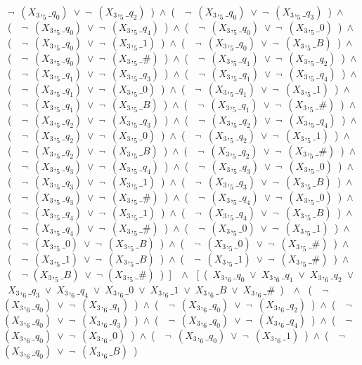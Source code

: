 ﻿\documentclass[a4paper,10pt]{article}
\begin{document}
\ $\neg$\ $(X_3,_5\_q_0)$\ $\vee$\ $\neg$\ $(X_3,_5\_q_2)$\ )\ $\wedge$\ (\ \ $\neg$\ $(X_3,_5\_q_0)$\ $\vee$\ $\neg$\ $(X_3,_5\_q_3)$\ )\ $\wedge$\ (\ \ $\neg$\ $(X_3,_5\_q_0)$\ $\vee$\ $\neg$\ $(X_3,_5\_q_4)$\ )\ $\wedge$\ (\ \ $\neg$\ $(X_3,_5\_q_0)$\ $\vee$\ $\neg$\ $(X_3,_5\_0)$\ )\ $\wedge$\ (\ \ $\neg$\ $(X_3,_5\_q_0)$\ $\vee$\ $\neg$\ $(X_3,_5\_1)$\ )\ $\wedge$\ (\ \ $\neg$\ $(X_3,_5\_q_0)$\ $\vee$\ $\neg$\ $(X_3,_5\_B)$\ )\ $\wedge$\ (\ \ $\neg$\ $(X_3,_5\_q_0)$\ $\vee$\ $\neg$\ $(X_3,_5\_\#)$\ )\ $\wedge$\ (\ \ $\neg$\ $(X_3,_5\_q_1)$\ $\vee$\ $\neg$\ $(X_3,_5\_q_2)$\ )\ $\wedge$\ (\ \ $\neg$\ $(X_3,_5\_q_1)$\ $\vee$\ $\neg$\ $(X_3,_5\_q_3)$\ )\ $\wedge$\ (\ \ $\neg$\ $(X_3,_5\_q_1)$\ $\vee$\ $\neg$\ $(X_3,_5\_q_4)$\ )\ $\wedge$\ (\ \ $\neg$\ $(X_3,_5\_q_1)$\ $\vee$\ $\neg$\ $(X_3,_5\_0)$\ )\ $\wedge$\ (\ \ $\neg$\ $(X_3,_5\_q_1)$\ $\vee$\ $\neg$\ $(X_3,_5\_1)$\ )\ $\wedge$\ (\ \ $\neg$\ $(X_3,_5\_q_1)$\ $\vee$\ $\neg$\ $(X_3,_5\_B)$\ )\ $\wedge$\ (\ \ $\neg$\ $(X_3,_5\_q_1)$\ $\vee$\ $\neg$\ $(X_3,_5\_\#)$\ )\ $\wedge$\ (\ \ $\neg$\ $(X_3,_5\_q_2)$\ $\vee$\ $\neg$\ $(X_3,_5\_q_3)$\ )\ $\wedge$\ (\ \ $\neg$\ $(X_3,_5\_q_2)$\ $\vee$\ $\neg$\ $(X_3,_5\_q_4)$\ )\ $\wedge$\ (\ \ $\neg$\ $(X_3,_5\_q_2)$\ $\vee$\ $\neg$\ $(X_3,_5\_0)$\ )\ $\wedge$\ (\ \ $\neg$\ $(X_3,_5\_q_2)$\ $\vee$\ $\neg$\ $(X_3,_5\_1)$\ )\ $\wedge$\ (\ \ $\neg$\ $(X_3,_5\_q_2)$\ $\vee$\ $\neg$\ $(X_3,_5\_B)$\ )\ $\wedge$\ (\ \ $\neg$\ $(X_3,_5\_q_2)$\ $\vee$\ $\neg$\ $(X_3,_5\_\#)$\ )\ $\wedge$\ (\ \ $\neg$\ $(X_3,_5\_q_3)$\ $\vee$\ $\neg$\ $(X_3,_5\_q_4)$\ )\ $\wedge$\ (\ \ $\neg$\ $(X_3,_5\_q_3)$\ $\vee$\ $\neg$\ $(X_3,_5\_0)$\ )\ $\wedge$\ (\ \ $\neg$\ $(X_3,_5\_q_3)$\ $\vee$\ $\neg$\ $(X_3,_5\_1)$\ )\ $\wedge$\ (\ \ $\neg$\ $(X_3,_5\_q_3)$\ $\vee$\ $\neg$\ $(X_3,_5\_B)$\ )\ $\wedge$\ (\ \ $\neg$\ $(X_3,_5\_q_3)$\ $\vee$\ $\neg$\ $(X_3,_5\_\#)$\ )\ $\wedge$\ (\ \ $\neg$\ $(X_3,_5\_q_4)$\ $\vee$\ $\neg$\ $(X_3,_5\_0)$\ )\ $\wedge$\ (\ \ $\neg$\ $(X_3,_5\_q_4)$\ $\vee$\ $\neg$\ $(X_3,_5\_1)$\ )\ $\wedge$\ (\ \ $\neg$\ $(X_3,_5\_q_4)$\ $\vee$\ $\neg$\ $(X_3,_5\_B)$\ )\ $\wedge$\ (\ \ $\neg$\ $(X_3,_5\_q_4)$\ $\vee$\ $\neg$\ $(X_3,_5\_\#)$\ )\ $\wedge$\ (\ \ $\neg$\ $(X_3,_5\_0)$\ $\vee$\ $\neg$\ $(X_3,_5\_1)$\ )\ $\wedge$\ (\ \ $\neg$\ $(X_3,_5\_0)$\ $\vee$\ $\neg$\ $(X_3,_5\_B)$\ )\ $\wedge$\ (\ \ $\neg$\ $(X_3,_5\_0)$\ $\vee$\ $\neg$\ $(X_3,_5\_\#)$\ )\ $\wedge$\ (\ \ $\neg$\ $(X_3,_5\_1)$\ $\vee$\ $\neg$\ $(X_3,_5\_B)$\ )\ $\wedge$\ (\ \ $\neg$\ $(X_3,_5\_1)$\ $\vee$\ $\neg$\ $(X_3,_5\_\#)$\ )\ $\wedge$\ (\ \ $\neg$ $(X_3,_5\_B)$\ $\vee$\ $\neg$ $(X_3,_5\_\#)$\ )\ ]\ \ $\wedge$ \ [\ (\ $X_3,_6\_q_0$\ $\vee$\ $X_3,_6\_q_1$\ $\vee$\ $X_3,_6\_q_2$\ $\vee$\ $X_3,_6\_q_3$\ $\vee$\ $X_3,_6\_q_4$\ $\vee$\ $X_3,_6\_0$\ $\vee$\ $X_3,_6\_1$\ $\vee$\ $X_3,_6\_B$\ $\vee$\ $X_3,_6\_\#$\ )\ \ $\wedge$ \ (\ \ $\neg$\ $(X_3,_6\_q_0)$\ $\vee$\ $\neg$\ $(X_3,_6\_q_1)$\ )\ $\wedge$\ (\ \ $\neg$\ $(X_3,_6\_q_0)$\ $\vee$\ $\neg$\ $(X_3,_6\_q_2)$\ )\ $\wedge$\ (\ \ $\neg$\ $(X_3,_6\_q_0)$\ $\vee$\ $\neg$\ $(X_3,_6\_q_3)$\ )\ $\wedge$\ (\ \ $\neg$\ $(X_3,_6\_q_0)$\ $\vee$\ $\neg$\ $(X_3,_6\_q_4)$\ )\ $\wedge$\ (\ \ $\neg$\ $(X_3,_6\_q_0)$\ $\vee$\ $\neg$\ $(X_3,_6\_0)$\ )\ $\wedge$\ (\ \ $\neg$\ $(X_3,_6\_q_0)$\ $\vee$\ $\neg$\ $(X_3,_6\_1)$\ )\ $\wedge$\ (\ \ $\neg$\ $(X_3,_6\_q_0)$\ $\vee$\ $\neg$\ $(X_3,_6\_B)$\ )\ 
\end{document}
